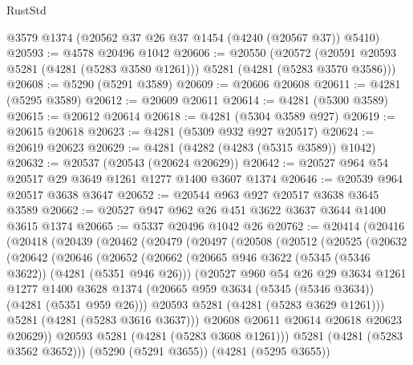 \begin{lexlean}{RustStd}
\begin{coremodule}
{\begin{coremodule}
{{{{{{{{{{{{{{{{{{{{{{{{{{{{{{{{{{{    @3579
    @1374
    (@20562 @37 @26 @37 @1454 (@4240 (@20567 @37)) @5410)
@20593 := @4578 @20496 @1042
@20606 := @20550
    (@20572 (@20591 @20593 @5281 (@4281 (@5283 @3580 @1261))) @5281 (@4281 (@5283 @3570 @3586)))
@20608 := @5290 (@5291 @3589)
@20609 := @20606 @20608
@20611 := @4281 (@5295 @3589)
@20612 := @20609 @20611
@20614 := @4281 (@5300 @3589)
@20615 := @20612 @20614
@20618 := @4281 (@5304 @3589 @927)
@20619 := @20615 @20618
@20623 := @4281 (@5309 @932 @927 @20517)
@20624 := @20619 @20623
@20629 := @4281 (@4282 (@4283 (@5315 @3589)) @1042)
@20632 := @20537 (@20543 (@20624 @20629))
@20642 := @20527 @964 @54 @20517 @29 @3649 @1261 @1277 @1400 @3607 @1374
@20646 := @20539 @964 @20517 @3638 @3647
@20652 := @20544 @963 @927 @20517 @3638 @3645 @3589
@20662 := @20527 @947 @962 @26 @451 @3622 @3637 @3644 @1400 @3615 @1374
@20665 := @5337 @20496 @1042 @26
@20762 := @20414
    (@20416
      (@20418
        (@20439
          (@20462
            (@20479
              (@20497
                (@20508
                  (@20512
                    (@20525
                      (@20632
                        (@20642
                          (@20646
                            (@20652
                              (@20662
                                (@20665 @946 @3622 (@5345 (@5346 @3622)) (@4281 (@5351 @946 @26)))
                                (@20527
                                  @960
                                  @54
                                  @26
                                  @29
                                  @3634
                                  @1261
                                  @1277
                                  @1400
                                  @3628
                                  @1374
                                  (@20665 @959 @3634 (@5345 (@5346 @3634)) (@4281 (@5351 @959 @26)))
                                  @20593
                                  @5281
                                  (@4281 (@5283 @3629 @1261)))
                                @5281
                                (@4281 (@5283 @3616 @3637)))
                              @20608
                              @20611
                              @20614
                              @20618
                              @20623
                              @20629))
                          @20593
                          @5281
                          (@4281 (@5283 @3608 @1261)))
                        @5281
                        (@4281 (@5283 @3562 @3652)))
                      (@5290 (@5291 @3655))
                      (@4281 (@5295 @3655))
}}}}}}}}}}}}}}}}}}}}}}}}}}}}}}}}}}}
\end{coremodule}}
\end{coremodule}
\end{lexlean}
